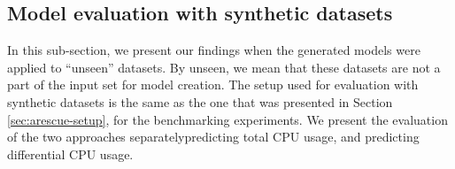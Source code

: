 




\subsection{Model evaluation with synthetic datasets}
In this sub-section, we present our findings when the generated
models were applied to ``unseen'' datasets. 
By unseen, we mean that these datasets are not a part of the
input set for model creation.
The setup used for evaluation with synthetic 
datasets is the same 
as the one that was presented in Section \ref{sec:arescue-setup}, 
for the benchmarking experiments.
We present the evaluation of the two approaches separately\textemdash{}predicting
total CPU usage, and predicting differential CPU usage.

